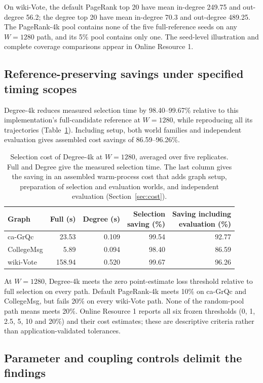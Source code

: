 \documentclass[smallextended]{svjour3}
\newcommand{\CollegeDegreeSaving}{86.59}
\newcommand{\WikiDegreeSaving}{96.26}
\begin{document}
On wiki-Vote, the default PageRank top 20 have mean in-degree 249.75 and out-degree 56.2; the degree top 20 have mean in-degree 70.3 and out-degree 489.25. The PageRank-4k pool contains none of the five full-reference seeds on any $W=1280$ path, and its 5\% pool contains only one. The seed-level illustration and complete coverage comparisons appear in Online Resource 1.

\subsection{Reference-preserving savings under specified timing scopes}
Degree-4k reduces measured selection time by 98.40--99.67\% relative to this implementation's full-candidate reference at $W=1280$, while reproducing all its trajectories (Table~\ref{tab:cost}). Including setup, both world families and independent evaluation gives assembled cost savings of \CollegeDegreeSaving{}--\WikiDegreeSaving{}\%.
\begin{table}[htbp]
\caption{Selection cost of Degree-4k at $W=1280$, averaged over five replicates. Full and Degree give the measured selection time. The last column gives the saving in an assembled warm-process cost that adds graph setup, preparation of selection and evaluation worlds, and independent evaluation (Section~\ref{sec:cost}).}\label{tab:cost}
\begin{tabular}{lrrrr}
\toprule
Graph & Full (s) & Degree (s) & \shortstack{Selection\\saving (\%)} & \shortstack{Saving including\\evaluation (\%)} \\
\midrule
ca-GrQc & 23.53 & 0.109 & 99.54 & 92.77 \\
CollegeMsg & 5.89 & 0.094 & 98.40 & 86.59 \\
wiki-Vote & 158.94 & 0.520 & 99.67 & 96.26 \\
\bottomrule
\end{tabular}
\end{table}


At $W=1280$, Degree-4k meets the zero point-estimate loss threshold relative to full selection on every path. Default PageRank-4k meets 10\% on ca-GrQc and CollegeMsg, but fails 20\% on every wiki-Vote path. None of the random-pool path means meets 20\%. Online Resource 1 reports all six frozen thresholds (0, 1, 2.5, 5, 10 and 20\%) and their cost estimates; these are descriptive criteria rather than application-validated tolerances.

\subsection{Parameter and coupling controls delimit the findings}
\end{document}
